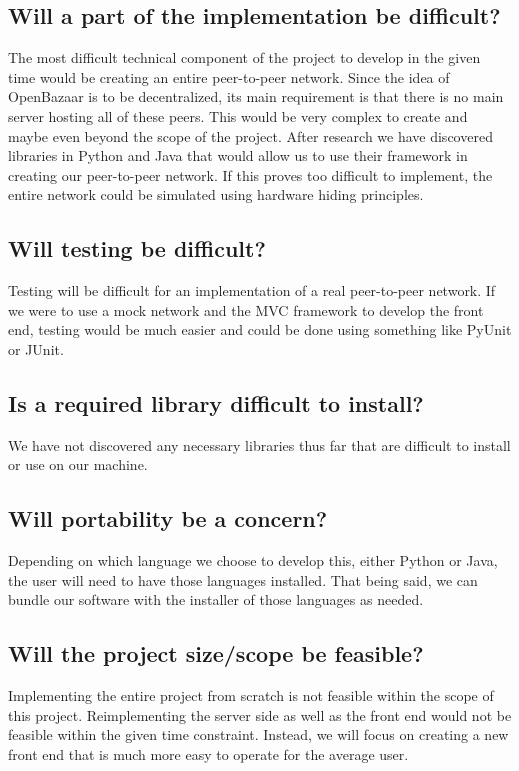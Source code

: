 \documentclass{article}
\begin{document}
\subsection{Will a part of the implementation be difficult?}

The most difficult technical component of the project to develop in the given time would be creating an entire peer-to-peer network.
Since the idea of OpenBazaar is to be decentralized, its main requirement is that there is no main server hosting all of these peers. This would be very complex to create and maybe even beyond the scope of the project. After research we have discovered libraries in Python and Java that would allow us to use their framework in creating our peer-to-peer network. If this proves too difficult to implement, the entire network could be simulated using hardware hiding principles.

\subsection{Will testing be difficult?}

Testing will be difficult for an implementation of a real peer-to-peer network. If we were to use a mock network and the MVC framework to develop the front end, testing would be much easier and could be done using something like PyUnit or JUnit.

\subsection{Is a required library difficult to install?}

We have not discovered any necessary libraries thus far that are difficult to install or use on our machine.

\subsection{Will portability be a concern?}

Depending on which language we choose to develop this, either Python or Java, the user will need to have those languages installed. That being said, we can bundle our software with the installer of those languages as needed.

\subsection{Will the project size/scope be feasible?}

Implementing the entire project from scratch is not feasible within the scope of this project. Reimplementing the server side as well as the front end would not be feasible within the given time constraint. Instead, we will focus on creating a new front end that is much more easy to operate for the average user.
\end{document}
